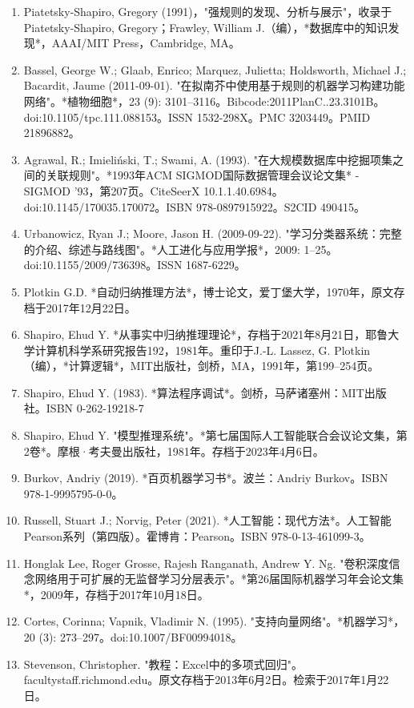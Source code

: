 \begin{enumerate}
\item Piatetsky-Shapiro, Gregory (1991)，"强规则的发现、分析与展示"，收录于Piatetsky-Shapiro, Gregory；Frawley, William J.（编），*数据库中的知识发现*，AAAI/MIT Press，Cambridge, MA。  
\item Bassel, George W.; Glaab, Enrico; Marquez, Julietta; Holdsworth, Michael J.; Bacardit, Jaume (2011-09-01). "在拟南芥中使用基于规则的机器学习构建功能网络"。*植物细胞*，23 (9): 3101–3116。Bibcode:2011PlanC..23.3101B。doi:10.1105/tpc.111.088153。ISSN 1532-298X。PMC 3203449。PMID 21896882。  
\item Agrawal, R.; Imieliński, T.; Swami, A. (1993). "在大规模数据库中挖掘项集之间的关联规则"。*1993年ACM SIGMOD国际数据管理会议论文集* - SIGMOD '93，第207页。CiteSeerX 10.1.1.40.6984。doi:10.1145/170035.170072。ISBN 978-0897915922。S2CID 490415。  
\item Urbanowicz, Ryan J.; Moore, Jason H. (2009-09-22). "学习分类器系统：完整的介绍、综述与路线图"。*人工进化与应用学报*，2009: 1–25。doi:10.1155/2009/736398。ISSN 1687-6229。  
\item Plotkin G.D. *自动归纳推理方法*，博士论文，爱丁堡大学，1970年，原文存档于2017年12月22日。
\item Shapiro, Ehud Y. *从事实中归纳推理理论*，存档于2021年8月21日，耶鲁大学计算机科学系研究报告192，1981年。重印于J.-L. Lassez, G. Plotkin（编），*计算逻辑*，MIT出版社，剑桥，MA，1991年，第199–254页。
\item Shapiro, Ehud Y. (1983). *算法程序调试*。剑桥，马萨诸塞州：MIT出版社。ISBN 0-262-19218-7
\item Shapiro, Ehud Y. "模型推理系统"。*第七届国际人工智能联合会议论文集，第2卷*。摩根·考夫曼出版社，1981年。存档于2023年4月6日。
\item Burkov, Andriy (2019). *百页机器学习书*。波兰：Andriy Burkov。ISBN 978-1-9995795-0-0。
\item Russell, Stuart J.; Norvig, Peter (2021). *人工智能：现代方法*。人工智能Pearson系列（第四版）。霍博肯：Pearson。ISBN 978-0-13-461099-3。
\item Honglak Lee, Roger Grosse, Rajesh Ranganath, Andrew Y. Ng. "卷积深度信念网络用于可扩展的无监督学习分层表示"。*第26届国际机器学习年会论文集*，2009年，存档于2017年10月18日。
\item Cortes, Corinna; Vapnik, Vladimir N. (1995). "支持向量网络"。*机器学习*，20 (3): 273–297。doi:10.1007/BF00994018。
\item Stevenson, Christopher. "教程：Excel中的多项式回归"。facultystaff.richmond.edu。原文存档于2013年6月2日。检索于2017年1月22日。

\end{enumerate}
